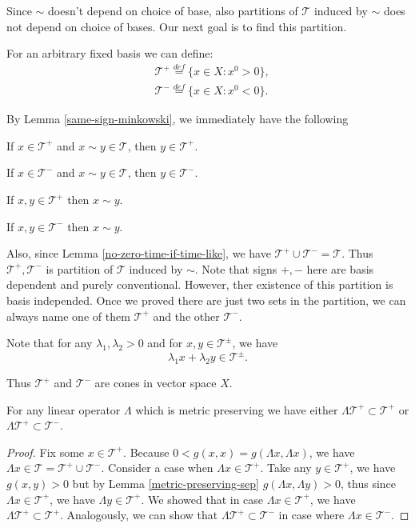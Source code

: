 \documentclass[main.tex]{subfiles}
\begin{document}
Since $\sim$ doesn't depend on choice of base, also partitions of $\mathcal{T}$ induced by $\sim$ does not depend on choice of bases. Our next goal is to find this partition.

For an arbitrary fixed basis we can define:
\begin{align}
\label{positive-time}
& \mathcal{T}^{+} \stackrel{def}{=} \{x\in X: x^0 > 0\},\\
\label{negative-time}
& \mathcal{T}^{-} \stackrel{def}{=} \{x\in X: x^0 < 0\}.
\end{align}

By Lemma \ref{same-sign-minkowski}, we immediately have the following

If $x\in \mathcal{T}^{+}$ and $x\sim y\in \mathcal{T}$, then $y\in \mathcal{T}^{+}$.
 
If $x\in \mathcal{T}^{-}$ and $x\sim y\in \mathcal{T}$, then $y\in \mathcal{T}^{-}$.

If $x, y\in \mathcal{T}^{+}$ then $x\sim y$.

If $x, y\in \mathcal{T}^{-}$ then $x\sim y$.

Also, since Lemma \ref{no-zero-time-if-time-like}, we have $\mathcal{T}^{+}\cup \mathcal{T}^{-} = \mathcal{T}$. Thus $\mathcal{T}^{+}, \mathcal{T}^{-}$ is partition of $\mathcal{T}$ induced by $\sim$. Note that signs $+, -$ here are basis dependent and purely conventional. However, ther existence of this partition is basis independed. Once we proved there are just two sets in the partition, we can always name one of them $\mathcal{T}^{+}$ and the other $\mathcal{T}^{-}$.

Note that for any $\lambda_1, \lambda_2 > 0$ and for $x, y \in \mathcal{T}^{\pm}$, we have
\begin{equation}
\lambda_1x + \lambda_2y \in \mathcal{T}^{\pm}.
\end{equation}

Thus $\mathcal{T}^{+}$ and $\mathcal{T}^{-}$ are cones in vector space $X$.

\begin{proposition}
\label{two-sets-of-metric-preserving}
For any linear operator $\Lambda$ which is metric preserving we have either $\Lambda\mathcal{T}^{+} \subset \mathcal{T}^{+}$ or $\Lambda\mathcal{T}^{+} \subset \mathcal{T}^{-}$. 
\end{proposition}
\begin{proof}
Fix some $x \in \mathcal{T}^{+}$. Because $0 < g(x, x) = g(\Lambda x, \Lambda x)$, we have $\Lambda x\in \mathcal{T} = \mathcal{T}^{+}\cup \mathcal{T}^{-}$. Consider a case when $\Lambda x\in \mathcal{T}^{+}$. Take any $y\in  \mathcal{T}^{+}$, we have $g(x, y) > 0$ but by Lemma \ref{metric-preserving-sep} $g(\Lambda x, \Lambda y) > 0$, thus since $\Lambda x\in \mathcal{T}^{+}$, we have $\Lambda y\in  \mathcal{T}^{+}$. We showed that in case $\Lambda x\in \mathcal{T}^{+}$, we have $\Lambda\mathcal{T}^{+} \subset \mathcal{T}^{+}$. Analogously, we can show that $\Lambda\mathcal{T}^{+} \subset \mathcal{T}^{-}$ in case where $\Lambda x\in \mathcal{T}^{-}$.
\end{proof}
\end{document}
